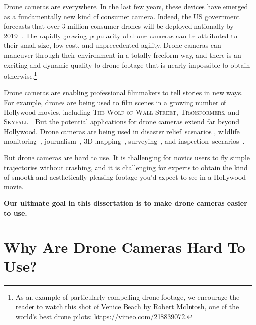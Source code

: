 
Drone cameras are everywhere.
In the last few years, these devices have emerged as a fundamentally new kind of consumer camera.
Indeed, the US government forecasts that over 3 million consumer drones will be deployed nationally by 2019~\cite{?}.
The rapidly growing popularity of drone cameras can be attributed to their small size, low cost, and unprecedented agility.
Drone cameras can maneuver through their environment in a totally freeform way, and there is an exciting and dynamic quality to drone footage that is nearly impossible to obtain otherwise.\footnote{As an example of particularly compelling drone footage, we encourage the reader to watch this shot of Venice Beach by Robert McIntosh, one of the world's best drone pilots: \url{https://vimeo.com/218839072}.}

Drone cameras are enabling professional filmmakers to tell stories in new ways. 
For example, drones are being used to film scenes in a growing number of Hollywood movies, including \textsc{The Wolf of Wall Street}, \textsc{Transformers}, and \textsc{Skyfall}~\cite{?}.
But the potential applications for drone cameras extend far beyond Hollywood.
Drone cameras are being used in disaster relief~scenarios \cite{?}, wildlife monitoring~\cite{?}, journalism~\cite{?}, 3D mapping~\cite{?}, surveying~\cite{?}, and inspection~scenarios~\cite{?}.

But drone cameras are hard to use.
It is challenging for novice users to fly simple trajectories without crashing, and it is challenging for experts to obtain the kind of smooth and aesthetically pleasing footage you'd expect to see in a Hollywood movie.

\begin{tcolorbox}[before skip=20pt, after skip=20pt, sharp corners]
\begin{center}
\textbf{Our ultimate goal in this dissertation is to make drone cameras easier to use.}
\end{center}
\end{tcolorbox}

\section{Why Are Drone Cameras Hard To Use?}


